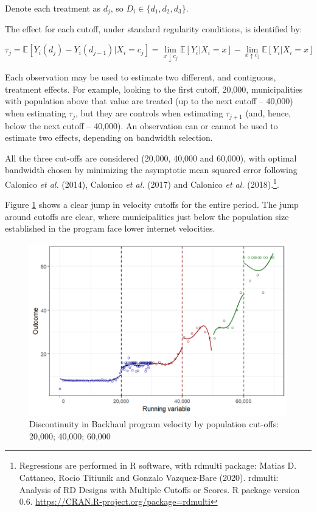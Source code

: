 \documentclass[
  12pt,
]{article}
\begin{document}
Denote each treatment as \(d_j\), so \(D_i \in \{d_1,d_2,d_3\}\).

The effect for each cutoff, under standard regularity conditions, is
identified by:

\begin{equation}
\tau_j= \mathbb{E}[Y_i(d_j) - Y_i(d_{j-1})|X_i=c_j]= \lim\limits_{x \downarrow c_j}\mathbb{E}[Y_i|X_i=x]-\lim\limits_{x \uparrow c_j}\mathbb{E}[Y_i|X_i=x]
\label{eq:1}
\end{equation}

Each observation may be used to estimate two different, and contiguous,
treatment effects. For example, looking to the first cutoff, 20,000,
municipalities with population above that value are treated (up to the
next cutoff -- 40,000) when estimating \(\tau_j\), but they are controls
when estimating \(\tau_{j+1}\) (and, hence, below the next cutoff --
40,000). An observation can or cannot be used to estimate two effects,
depending on bandwidth selection.

All the three cut-offs are considered (20,000, 40,000 and 60,000), with
optimal bandwidth chosen by minimizing the asymptotic mean squared error
following Calonico \emph{et al.} (2014), Calonico \emph{et al.} (2017)
and Calonico \emph{et al.} (2018).\footnote{Regressions are performed in
  R software, with rdmulti package: Matias D. Cattaneo, Rocio Titiunik
  and Gonzalo Vazquez-Bare (2020). rdmulti: Analysis of RD Designs with
  Multiple Cutoffs or Scores. R package version 0.6.
  \url{https://CRAN.R-project.org/package=rdmulti}}.

Figure \ref{fig:2} shows a clear jump in velocity cutoffs for the entire
period. The jump around cutoffs are clear, where municipalities just
below the population size established in the program face lower internet
velocities.

\begin{figure}
\centering
\includegraphics{artigo1_files/figure-latex/discontinuity-1.png}
\caption{Discontinuity in Backhaul program velocity by population
cut-offs: 20,000; 40,000; 60,000 \label{fig:2}}
\end{figure}
\end{document}
